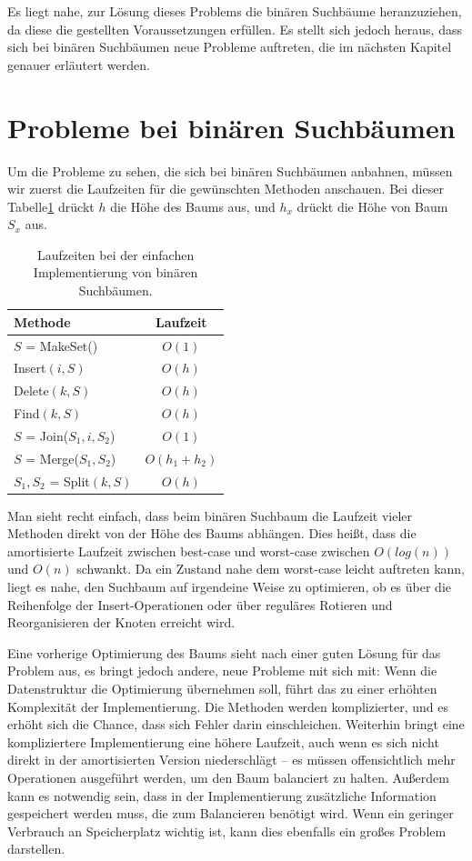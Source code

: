 \documentclass[a4paper]{scrreprt}
\theoremstyle{definition}
\begin{document}
Es liegt nahe, zur Lösung dieses Problems die binären Suchbäume heranzuziehen, da diese die gestellten Voraussetzungen erfüllen.
Es stellt sich jedoch heraus, dass sich bei binären Suchbäumen neue Probleme auftreten, die im nächsten Kapitel genauer erläutert werden.

\section{Probleme bei binären Suchbäumen}
\label{sec:binaryproblems}

Um die Probleme zu sehen, die sich bei binären Suchbäumen anbahnen, müssen wir zuerst die Laufzeiten für die gewünschten Methoden anschauen. Bei dieser Tabelle\ref{tab:binarytree} drückt $h$ die Höhe des Baums aus, und $h_x$ drückt die Höhe von Baum $S_x$ aus.

\begin{table}
\centering
\begin{tabular}{l|c}
	Methode & Laufzeit\\
	\hline
	$S$ = MakeSet() & $O(1)$\\
	Insert$(i, S)$ & $O(h)$ \\
	Delete$(k, S)$ & $O(h)$ \\
	Find$(k, S)$ & $O(h)$ \\
	$S$ = Join($S_1, i, S_2$) & $O(1)$ \\
	$S$ = Merge($S_1, S_2$) & $O(h_1 + h_2)$ \\
	$S_1, S_2$ = Split$(k, S)$ & $O(h)$
\end{tabular}
\caption[Laufzeiten Binärbaum]{Laufzeiten bei der einfachen Implementierung von binären Suchbäumen.}
\label{tab:binarytree}
\end{table}

Man sieht recht einfach, dass beim binären Suchbaum die Laufzeit vieler Methoden direkt von der Höhe des Baums abhängen.
Dies heißt, dass die amortisierte Laufzeit zwischen best-case und worst-case zwischen $O(log(n))$ und $O(n)$ schwankt.
Da ein Zustand nahe dem worst-case leicht auftreten kann, liegt es nahe, den Suchbaum auf irgendeine Weise zu optimieren, ob es über die Reihenfolge der Insert-Operationen oder über reguläres Rotieren und Reorganisieren der Knoten erreicht wird.

Eine vorherige Optimierung des Baums sieht nach einer guten Lösung für das Problem aus, es bringt jedoch andere, neue Probleme mit sich mit:
Wenn die Datenstruktur die Optimierung übernehmen soll, führt das zu einer erhöhten Komplexität der Implementierung.
Die Methoden werden komplizierter, und es erhöht sich die Chance, dass sich Fehler darin einschleichen.
Weiterhin bringt eine kompliziertere Implementierung eine höhere Laufzeit, auch wenn es sich nicht direkt in der amortisierten Version niederschlägt -- es müssen offensichtlich mehr Operationen ausgeführt werden, um den Baum balanciert zu halten.
Außerdem kann es notwendig sein, dass in der Implementierung zusätzliche Information gespeichert werden muss, die zum Balancieren benötigt wird.
Wenn ein geringer Verbrauch an Speicherplatz wichtig ist, kann dies ebenfalls ein großes Problem darstellen.
\end{document}
